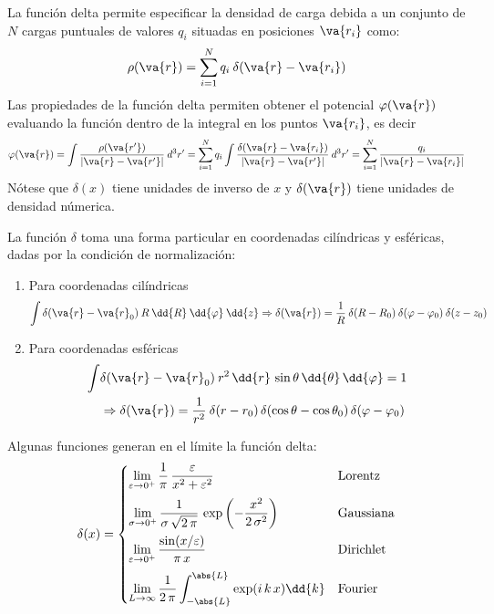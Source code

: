 La función delta permite especificar la densidad de
carga debida a un conjunto de $N$ cargas puntuales de valores $q_{i}$ situadas en posiciones $\va{r_{i}}$  como:
\begin{equation}
\rho (\va{r}) = \sum_{i=1}^{N} q_{i} \: \delta(\va{r} - \va{r_{i}})
\label{eq:ecuacion_A_04}
\end{equation}
Las propiedades de la función delta permiten obtener el potencial $\varphi(\va{r})$ evaluando la función dentro de la integral en los puntos $\va{r_{i}}$, es decir
\begin{equation}
\varphi(\va{r}) = \int \dfrac{\rho(\va{r^{\prime}})}{\vert \va{r} - \va{r^{\prime}} \vert} \: d^{3}r^{\prime} = \sum_{i=1}^{N} q_{i} \int \dfrac{\delta ( \va{r} - \va{r_{i}})}{\vert \va{r} - \va{r^{\prime}} \vert} \: d^{3}r^{\prime} = \sum_{i=1}^{N} \dfrac{q_{i}}{\vert \va{r} - \va{r_{i}} \vert}
\label{eq:ecuacion_A_05}
\end{equation}
Nótese que $\delta (x)$ tiene unidades de inverso de $x$ y $\delta (\va{r})$ tiene unidades de densidad númerica.
\par
La función $\delta$ toma una forma particular en coordenadas cilíndricas y esféricas, dadas por la condición de normalización:
\begin{enumerate}
\item Para coordenadas cilíndricas
\begin{equation}
\int \delta (\va{r} - \va{r}_{0}) \: R \: \dd{R} \: \dd{\varphi} \: \dd{z} \Rightarrow \delta (\va{r}) =  \dfrac{1}{R} \: \delta (R - R_{0}) \: \delta (\varphi - \varphi_{0}) \: \delta (z - z_{0})
\end{equation}
\item  Para coordenadas esféricas
\begin{equation}
\begin{aligned}
\int & \delta (\va{r} - \va{r}_{0}) \: r^{2} \, \dd{r} \, \sin \theta \, \dd{\theta} \, \dd{\varphi} = 1 \\
&\Rightarrow \delta (\va{r}) = \dfrac{1}{r^{2}} \: \delta (r - r_{0}) \, \delta (\cos \theta - \cos \theta_{0}) \, \delta (\varphi - \varphi_{0})
\end{aligned}
\end{equation}
\end{enumerate}
Algunas funciones generan en el límite la función delta:
\begin{align*}
\delta(x) = \begin{cases}
\displaystyle
\lim_{\varepsilon \to 0^{+}} \dfrac{1}{\pi} \, \dfrac{\varepsilon}{x^{2} + \varepsilon^{2}} & \mbox{Lorentz} \\[1em]
\displaystyle
\lim_{\sigma \to 0^{+}} \dfrac{1}{\sigma \, \sqrt{2 \, \pi}} \, \exp \left( - \dfrac{x^{2}}{2 \, \sigma^{2}} \right) & \mbox{Gaussiana} \\[1em]
\displaystyle \lim_{\varepsilon \to 0^{+}} \dfrac{\sin(x / \varepsilon)}{ \pi \, x} & \mbox{Dirichlet} \\[1em]
\displaystyle \lim_{L \to \infty} \dfrac{1}{2 \, \pi} \int_{- \abs{L}}^{\abs{L}} \exp(i \, k \, x) \dd{k} & \mbox{Fourier}
\end{cases}
\end{align*}
